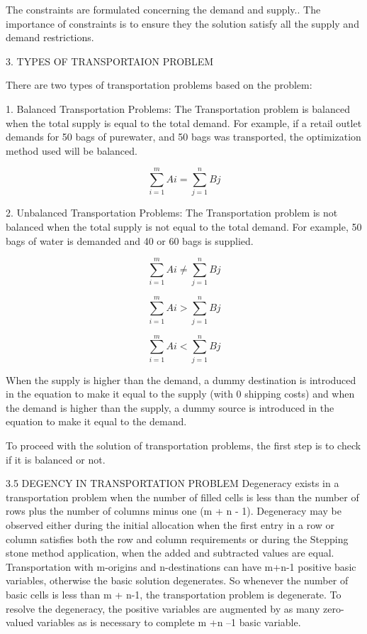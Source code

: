 \documentclass{article}
\begin{document}
The constraints are formulated concerning the demand and supply.. The importance of constraints is to ensure they the solution satisfy all the supply and demand restrictions.

3. TYPES OF TRANSPORTAION PROBLEM

There are two  types of transportation problems based on the problem:

1. Balanced Transportation Problems: The Transportation problem is balanced when the total supply is equal to the total demand. For example, if a retail outlet demands for 50 bags of purewater, and 50 bags was transported, the optimization method used will be balanced.

\[\sum_{i=1}^{m} Ai = \sum_{j=1}^{n}Bj \]


2. Unbalanced Transportation Problems: The Transportation problem is not balanced when the total supply is not equal to the total demand. For example, 50 bags of water is demanded and 40 or 60 bags is supplied.

\[\sum_{i=1}^{m} Ai \neq \sum_{j=1}^{n}Bj \]

\[\sum_{i=1}^{m} Ai > \sum_{j=1}^{n}Bj \]

\[\sum_{i=1}^{m} Ai < \sum_{j=1}^{n}Bj \]

When the supply is higher than the demand, a dummy destination is introduced in the equation to make it equal to the supply (with 0 shipping costs) and when the demand is higher than the supply, a dummy source is introduced in the equation to make it equal to the demand.

To proceed with the solution of transportation problems, the first step is to check if it is balanced or not.


3.5 DEGENCY IN TRANSPORTATION PROBLEM 
Degeneracy exists in a transportation problem when the number of filled cells is less than the number of rows plus the number of columns minus one (m + n - 1). Degeneracy may be observed either during the initial allocation when the first entry in a row or column satisfies both the row and column requirements or during the Stepping stone method application, when the added and subtracted values are equal.
Transportation with m-origins and n-destinations can have m+n-1 positive basic variables, otherwise the basic solution degenerates. So whenever the number of basic cells is less than m + n-1, the transportation problem is degenerate. To resolve the degeneracy, the positive variables are augmented by as many zero-valued variables as is necessary to complete m +n –1 basic variable. 
\end{document}
